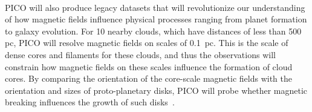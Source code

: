\documentclass[PICOReport.tex]{subfiles}
\begin{document}


%
\\
PICO will also produce legacy datasets that will revolutionize our understanding of how magnetic fields influence physical processes ranging from planet formation to galaxy evolution.  For 10 nearby clouds, which have distances of less than 500 pc, PICO will resolve magnetic fields on scales of 0.1~pc. This is the scale of dense cores and filaments for these clouds, and thus the observations will constrain how magnetic fields on these scales influence the formation of cloud cores.  By comparing the orientation of the core-scale magnetic fields with the orientation and sizes of proto-planetary disks, PICO will probe whether magnetic breaking influences the growth of such disks~\citep{allen_2003,li_2014}. 
\end{document}

